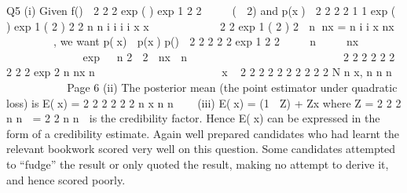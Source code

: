\documentclass[a4paper,12pt]{article}
\begin{document}
Q5 (i) Given
f(\theta) 
2
2 2
exp ( ) exp 1
2 2
\theta  \mu
  
\sigma \sigma
(  2\mu\theta)
and
p(x\theta) 
2
2
2 2
1 1
exp ( ) exp 1 ( 2 )
2 2
n n
i
i
i i
x x
 
 \theta
   \theta  \theta
\tau \tau  
 2
2
exp 1 ( 2 )
2
 n\theta  nx\theta
{}
=
  n
i
i
x nx

 
 
 
 ,
we want
p(\thetax)  p(x\theta) p(\theta)
 2
2 2 2 2
exp 1
2 2
   n  \theta   \mu  nx  \theta         \sigma \tau   \sigma \tau  
 exp    n
2   2 \mu{}  nx
  n

 

 
\theta
 

 








2 2 2 2 2
2 2 2 2 exp
2
n nx
n
 \tau  \sigma  \mu\tau  \sigma    \theta   
 \sigma \tau  \tau  \sigma  
 \thetax ~
  2 2 2 2
2 2 2 2 2 2 N n x,
n n n
 \tau \sigma \sigma \tau 
 \mu  
 \tau  \sigma \tau  \sigma \tau  \sigma 
Page 6
(ii) The posterior mean (the point estimator under quadratic loss) is
E(\thetax) =
  2 2
2 2 2 2
n x
n n
\tau \sigma
\mu 
\tau  \sigma \tau  \sigma
(iii) E(\thetax) = (1  Z) \mu + Zx
where
Z =
  2
2 2
n
n
\sigma
\tau  \sigma
= 2
2
n
n \tau

\sigma
is the credibility factor. Hence E(\thetax) can be expressed in the form of a
credibility estimate.
Again well prepared candidates who had learnt the relevant bookwork scored
very well on this question. Some candidates attempted to “fudge” the result or
only quoted the result, making no attempt to derive it, and hence scored
poorly.
\end{document}
